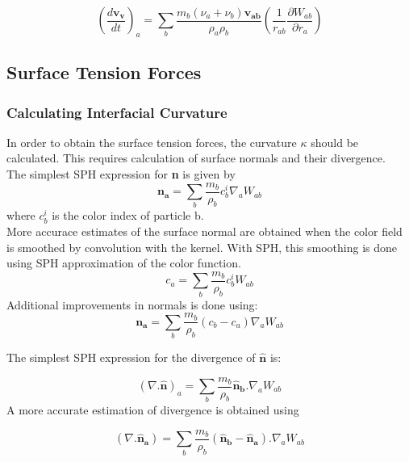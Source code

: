 \begin{equation}
 \left(\frac{d\mathbf{v_v}}{dt} \right)_a = \sum_b \frac{m_b(\nu_a + \nu_b)\mathbf{v_{ab}}}{\rho_a\rho_b} \left(\frac{1}{r_{ab}} \frac{\partial W_{ab}}{\partial r_a}\right) 
\end{equation}

\subsection{Surface Tension Forces}

\subsubsection{Calculating Interfacial Curvature}

In order to obtain the surface tension forces, the curvature $\kappa$ should be calculated. This requires calculation of surface normals and their divergence.\citep{Morris} \\

The simplest SPH expression for \textbf{n} is given by
\begin{equation}
 \mathbf{n_a} = \sum_b \frac{m_b}{\rho_b} c_b^i \nabla_a W_{ab}
\end{equation}
\noindent
where $c_b^i$ is the color index of particle b. \\
More accurace estimates of the surface normal are obtained when the color field is smoothed by convolution with the kernel. With SPH, this smoothing is done using SPH approximation of the color function.
\begin{equation}
 c_a = \sum_b \frac{m_b}{\rho_b}c_b^i W_{ab}
\end{equation}
\noindent
Additional improvements in normals is done using:
\begin{equation}
 \mathbf{n_a} = \sum_b \frac{m_b}{\rho_b} (c_b - c_a)\nabla_a W_{ab}
  \label{normal}
 \end{equation}

The simplest SPH expression for the divergence of $\mathbf{\hat n}$ is:

\begin{equation}
 \left( \nabla . \mathbf{\hat n}\right)_a = \sum_b \frac{m_b}{\rho_b} \mathbf{\hat n_b}.\nabla_a W_{ab}
\end{equation}
\noindent
A more accurate estimation of divergence is obtained using \citep{Monaghan1992}

\begin{equation}
 \left( \nabla . \mathbf{\hat n_a}\right) = \sum_b \frac{m_b}{\rho_b}(\mathbf{\hat n_b} - \mathbf{\hat n_a}). \nabla_a W_{ab} 
  \label{divergence}
 \end{equation}


